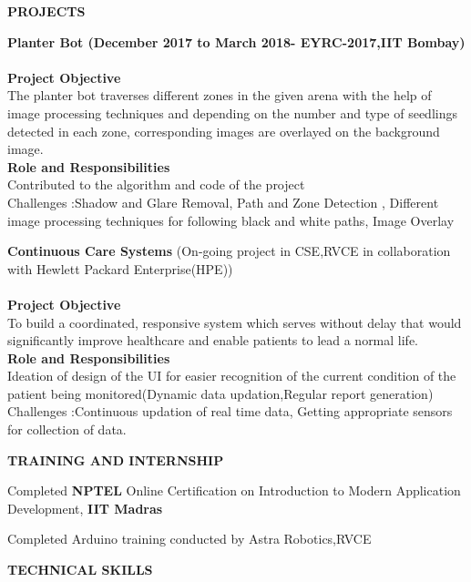 \documentclass[letterpaper,11pt,oneside]{article}
\begin{document}
\vspace{5ex}

\noindent\textbf{{\normalsize PROJECTS}} \begin{enumerate}
	\item 
	\small {\textbf{Planter Bot (December 2017 to March 2018- EYRC-2017,IIT Bombay)}\\\\
		\textbf{Project Objective}\\
		The planter bot traverses different zones in the given arena with the help of image processing techniques
		and depending on the number and type of seedlings detected in each zone, corresponding images are overlayed on the background image.\\
		\textbf{Role and Responsibilities}\\
		Contributed to the algorithm and code of the project\\
		Challenges :Shadow and Glare Removal, Path and Zone Detection , Different image processing techniques for following black and white paths, Image Overlay
		
		\item \textbf{Continuous Care Systems}
		(On-going project in CSE,RVCE in collaboration with Hewlett Packard Enterprise(HPE))\\\\
		\textbf{Project Objective}\\
		To build a coordinated, responsive system which serves without delay that would significantly improve healthcare and enable patients to lead a normal life.\\
		\textbf{Role and Responsibilities}\\
		Ideation of design of the UI for easier recognition of the current condition of the patient being monitored(Dynamic data updation,Regular report generation)\\
		Challenges :Continuous updation of real time data, Getting appropriate sensors for collection of data.
	}
	
\end{enumerate}

\vspace{2ex}

\noindent\textbf{{\normalsize  TRAINING AND INTERNSHIP}} \begin{itemize}
	\small {\item 	Completed \textbf{NPTEL} Online Certification on Introduction to Modern Application Development, \textbf{IIT Madras}
		\item	Completed Arduino training conducted by Astra Robotics,RVCE
	}
\end{itemize}
\vspace{2ex}
\noindent\textbf{{\normalsize  TECHNICAL SKILLS}} 
\end{document}
